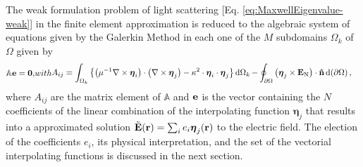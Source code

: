The weak formulation problem of light scattering  [Eq. \eqref{eq:MaxwellEigenvalue-weak}] in the finite element approximation is reduced to the algebraic system of equations given by the Galerkin Method in each one of the $M$ subdomains $\Omega_k$ of $\Omega$ given by \cite{larson_finite_2013,jin_theory_2010}
%
\begin{subequations}
        \label{eq:Vec-FEM}
\begin{align}
    \mathbb{A} \vb{e} = \vb{0},
\end{align}%
with
\begin{align}
    A_{ij}  =     \int_{\Omega_k} \left\{\qty(\mu^{-1}\nabla\times\boldsymbol{\eta}_i)\cdot \qty(\nabla\times\boldsymbol{\eta}_j) -  \kappa^2  \cdot   \boldsymbol{\eta}_i \cdot \boldsymbol{\eta}_j \right\} \dd{\Omega_k}
            -& \oint_{\partial\Omega} \qty(\boldsymbol{\eta}_j\times \vb{E}_\text{N}) \cdot\vu{n}\dd{(\partial\Omega)},
\end{align}%
\end{subequations}%
\noindent%
%
where $A_{ij}$ are the matrix element of $\mathbb{A}$ and  $\vb{e}$ is the vector containing the $N$ coefficients of the linear combination of the interpolating function $\boldsymbol{\eta}_j$ that results into a approximated solution $\tilde{\vb{E}}(\vb{r}) = \sum_i e_i \boldsymbol{\eta}_j(\vb{r})$ to the electric field. The election of the coefficients $e_i$, its physical interpretation, and the set of the vectorial interpolating functions  is discussed in the next section.
